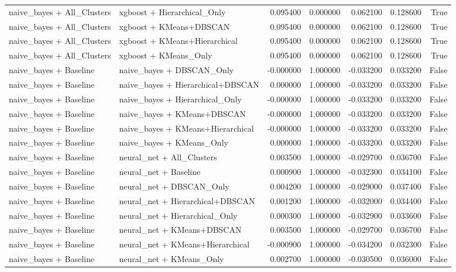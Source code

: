\begin{tabular}{llrrrrr}
naive_bayes + All_Clusters & xgboost + Hierarchical_Only & 0.095400 & 0.000000 & 0.062100 & 0.128600 & True \\
naive_bayes + All_Clusters & xgboost + KMeans+DBSCAN & 0.095400 & 0.000000 & 0.062100 & 0.128600 & True \\
naive_bayes + All_Clusters & xgboost + KMeans+Hierarchical & 0.095400 & 0.000000 & 0.062100 & 0.128600 & True \\
naive_bayes + All_Clusters & xgboost + KMeans_Only & 0.095400 & 0.000000 & 0.062100 & 0.128600 & True \\
naive_bayes + Baseline & naive_bayes + DBSCAN_Only & -0.000000 & 1.000000 & -0.033200 & 0.033200 & False \\
naive_bayes + Baseline & naive_bayes + Hierarchical+DBSCAN & 0.000000 & 1.000000 & -0.033200 & 0.033200 & False \\
naive_bayes + Baseline & naive_bayes + Hierarchical_Only & -0.000000 & 1.000000 & -0.033200 & 0.033200 & False \\
naive_bayes + Baseline & naive_bayes + KMeans+DBSCAN & -0.000000 & 1.000000 & -0.033200 & 0.033200 & False \\
naive_bayes + Baseline & naive_bayes + KMeans+Hierarchical & -0.000000 & 1.000000 & -0.033200 & 0.033200 & False \\
naive_bayes + Baseline & naive_bayes + KMeans_Only & 0.000000 & 1.000000 & -0.033200 & 0.033200 & False \\
naive_bayes + Baseline & neural_net + All_Clusters & 0.003500 & 1.000000 & -0.029700 & 0.036700 & False \\
naive_bayes + Baseline & neural_net + Baseline & 0.000900 & 1.000000 & -0.032300 & 0.034100 & False \\
naive_bayes + Baseline & neural_net + DBSCAN_Only & 0.004200 & 1.000000 & -0.029000 & 0.037400 & False \\
naive_bayes + Baseline & neural_net + Hierarchical+DBSCAN & 0.001200 & 1.000000 & -0.032000 & 0.034400 & False \\
naive_bayes + Baseline & neural_net + Hierarchical_Only & 0.000300 & 1.000000 & -0.032900 & 0.033600 & False \\
naive_bayes + Baseline & neural_net + KMeans+DBSCAN & 0.003500 & 1.000000 & -0.029700 & 0.036700 & False \\
naive_bayes + Baseline & neural_net + KMeans+Hierarchical & -0.000900 & 1.000000 & -0.034200 & 0.032300 & False \\
naive_bayes + Baseline & neural_net + KMeans_Only & 0.002700 & 1.000000 & -0.030500 & 0.036000 & False \\

\end{tabular}
